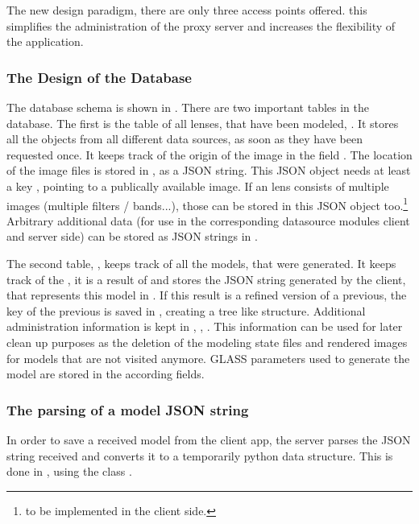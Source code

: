 The new design paradigm, there are only three access points offered. this simplifies the administration of the proxy server and increases the flexibility of the application.




\subsubsection{The Design of the Database}



The database schema is shown in .
There are two important tables in the database.
The first is the table of all lenses, that have been modeled, .
It stores all the objects from all different data sources, as soon as they have been requested once.
It keeps track of the origin of the image in the field .
The location of the image files is stored in , as a JSON string.
This JSON object needs at least a key , pointing to a publically available image.
If an lens consists of multiple images (multiple filters / bands...), those can be stored in this JSON object too.\footnote{to be implemented in the client side.}
Arbitrary additional data (for use in the corresponding datasource modules client and server side) can be stored as JSON strings in .

The second table, , keeps track of all the models, that were generated.
It keeps track of the , it is a result of and stores the JSON string generated by the client, that represents this model in .
If this result is a refined version of a previous, the key of the previous is saved in , creating a tree like structure.
Additional administration information is kept in , , .
This information can be used for later clean up purposes as the deletion of the modeling state files and rendered images for models that are not visited anymore.
GLASS parameters used to generate the model are stored in the according fields.


\subsubsection{The parsing of a model JSON string}

In order to save a received model from the client app, the server parses the JSON string received and converts it to a temporarily python data structure.
This is done in , using the class .

